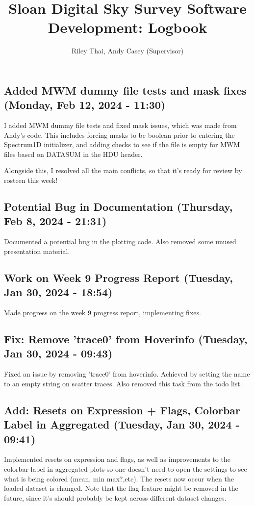 \documentclass[a4paper]{article}
\title{Sloan Digital Sky Survey Software Development: Logbook}
\author{Riley Thai, Andy Casey (Supervisor)}
\begin{document}
\maketitle

\subsection*{Added MWM dummy file tests and mask fixes (Monday, Feb 12, 2024 - 11:30)}
I added MWM dummy file tests and fixed mask issues, which was made from Andy's code. This includes forcing masks to be boolean prior to entering the Spectrum1D initializer, and adding checks to see if the file is empty for MWM files based on DATASUM in the HDU header.

Alongside this, I resolved all the main conflicts, so that it's ready for review by rosteen this week!

\subsection*{Potential Bug in Documentation (Thursday, Feb 8, 2024 - 21:31)}
Documented a potential bug in the plotting code. Also removed some unused presentation material.

\subsection*{Work on Week 9 Progress Report (Tuesday, Jan 30, 2024 - 18:54)}
Made progress on the week 9 progress report, implementing fixes.

\subsection*{Fix: Remove 'trace0' from Hoverinfo (Tuesday, Jan 30, 2024 - 09:43)}
Fixed an issue by removing 'trace0' from hoverinfo. Achieved by setting the name to an empty string on scatter traces. Also removed this task from the todo list.

\subsection*{Add: Resets on Expression + Flags, Colorbar Label in Aggregated (Tuesday, Jan 30, 2024 - 09:41)}
Implemented resets on expression and flags, as well as improvements to the colorbar label in aggregated plots so one doesn't need to open the settings to see what is being colored (mean, min max?,etc). The resets now occur when the loaded dataset is changed. Note that the flag feature might be removed in the future, since it's should probably be kept across different dataset changes.
\end{document}
